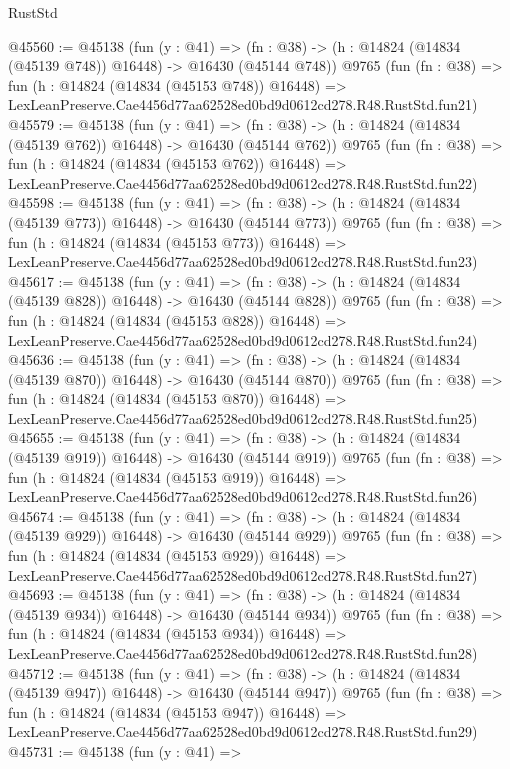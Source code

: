 \begin{lexlean}{RustStd}
\begin{coremodule}
@45560 := @45138
    (fun (y : @41) =>
    (fn : @38) -> (h : @14824 (@14834 (@45139 @748)) @16448) -> @16430 (@45144 @748))
    @9765
    (fun (fn : @38) =>
    fun (h : @14824 (@14834 (@45153 @748)) @16448) =>
    LexLeanPreserve.Cae4456d77aa62528ed0bd9d0612cd278.R48.RustStd.fun21)
@45579 := @45138
    (fun (y : @41) =>
    (fn : @38) -> (h : @14824 (@14834 (@45139 @762)) @16448) -> @16430 (@45144 @762))
    @9765
    (fun (fn : @38) =>
    fun (h : @14824 (@14834 (@45153 @762)) @16448) =>
    LexLeanPreserve.Cae4456d77aa62528ed0bd9d0612cd278.R48.RustStd.fun22)
@45598 := @45138
    (fun (y : @41) =>
    (fn : @38) -> (h : @14824 (@14834 (@45139 @773)) @16448) -> @16430 (@45144 @773))
    @9765
    (fun (fn : @38) =>
    fun (h : @14824 (@14834 (@45153 @773)) @16448) =>
    LexLeanPreserve.Cae4456d77aa62528ed0bd9d0612cd278.R48.RustStd.fun23)
@45617 := @45138
    (fun (y : @41) =>
    (fn : @38) -> (h : @14824 (@14834 (@45139 @828)) @16448) -> @16430 (@45144 @828))
    @9765
    (fun (fn : @38) =>
    fun (h : @14824 (@14834 (@45153 @828)) @16448) =>
    LexLeanPreserve.Cae4456d77aa62528ed0bd9d0612cd278.R48.RustStd.fun24)
@45636 := @45138
    (fun (y : @41) =>
    (fn : @38) -> (h : @14824 (@14834 (@45139 @870)) @16448) -> @16430 (@45144 @870))
    @9765
    (fun (fn : @38) =>
    fun (h : @14824 (@14834 (@45153 @870)) @16448) =>
    LexLeanPreserve.Cae4456d77aa62528ed0bd9d0612cd278.R48.RustStd.fun25)
@45655 := @45138
    (fun (y : @41) =>
    (fn : @38) -> (h : @14824 (@14834 (@45139 @919)) @16448) -> @16430 (@45144 @919))
    @9765
    (fun (fn : @38) =>
    fun (h : @14824 (@14834 (@45153 @919)) @16448) =>
    LexLeanPreserve.Cae4456d77aa62528ed0bd9d0612cd278.R48.RustStd.fun26)
@45674 := @45138
    (fun (y : @41) =>
    (fn : @38) -> (h : @14824 (@14834 (@45139 @929)) @16448) -> @16430 (@45144 @929))
    @9765
    (fun (fn : @38) =>
    fun (h : @14824 (@14834 (@45153 @929)) @16448) =>
    LexLeanPreserve.Cae4456d77aa62528ed0bd9d0612cd278.R48.RustStd.fun27)
@45693 := @45138
    (fun (y : @41) =>
    (fn : @38) -> (h : @14824 (@14834 (@45139 @934)) @16448) -> @16430 (@45144 @934))
    @9765
    (fun (fn : @38) =>
    fun (h : @14824 (@14834 (@45153 @934)) @16448) =>
    LexLeanPreserve.Cae4456d77aa62528ed0bd9d0612cd278.R48.RustStd.fun28)
@45712 := @45138
    (fun (y : @41) =>
    (fn : @38) -> (h : @14824 (@14834 (@45139 @947)) @16448) -> @16430 (@45144 @947))
    @9765
    (fun (fn : @38) =>
    fun (h : @14824 (@14834 (@45153 @947)) @16448) =>
    LexLeanPreserve.Cae4456d77aa62528ed0bd9d0612cd278.R48.RustStd.fun29)
@45731 := @45138
    (fun (y : @41) =>

\end{coremodule}
\end{lexlean}
